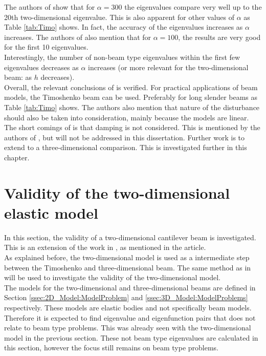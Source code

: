 \documentclass[../../main.tex]{subfiles}
\begin{document}
The authors of \cite{LVV09} show that for $\alpha = 300$ the eigenvalues compare very well up to the 20th two-dimensional eigenvalue. This is also apparent for other values of $\alpha$ as Table \ref{tab:Timo} shows. In fact, the accuracy of the eigenvalues increases as $\alpha$ increases. The authors of \cite{LVV09} also mention that for $\alpha = 100$, the results are very good for the first 10 eigenvalues.\\

Interestingly, the number of non-beam type eigenvalues within the first few eigenvalues decreases as $\alpha$ increases (or more relevant for the two-dimensional beam: as $h$ decreases).\\

Overall, the relevant conclusions of \cite{LVV09} is verified. For practical applications of beam models, the Timoshenko beam can be used. Preferably for long slender beams as Table \ref{tab:Timo} shows. The authors also mention that nature of the disturbance should also be taken into consideration, mainly because the models are linear.\\

 The short comings of \cite{LVV09} is that damping is not considered. This is mentioned by the authors of \cite{LVV09}, but will not be addressed in this dissertation. Further work is to extend \cite{LVV09} to a three-dimensional comparison. This is investigated further in this chapter.\\

\section{Validity of the two-dimensional elastic model}
In this section, the validity of a two-dimensional cantilever beam is investigated. This is an extension of the work in \cite{LVV09}, as mentioned in the article.\\

As explained before, the two-dimensional model is used as a intermediate step between the Timoshenko and three-dimensional beam. The same method as in \cite{LVV09} will be used to investigate the validity of the two-dimensional model.\\

The models for the two-dimensional and three-dimensional beams are defined in Section \ref{ssec:2D_Model:ModelProblem} and \ref{ssec:3D_Model:ModelProblems} respectively. These models are elastic bodies and not specifically beam models. Therefore it is expected to find eigenvalue and eigenfunction pairs that does not relate to beam type problems. This was already seen with the two-dimensional model in the previous section. These not beam type eigenvalues are calculated in this section, however the focus still remains on beam type problems.\\
\end{document}
